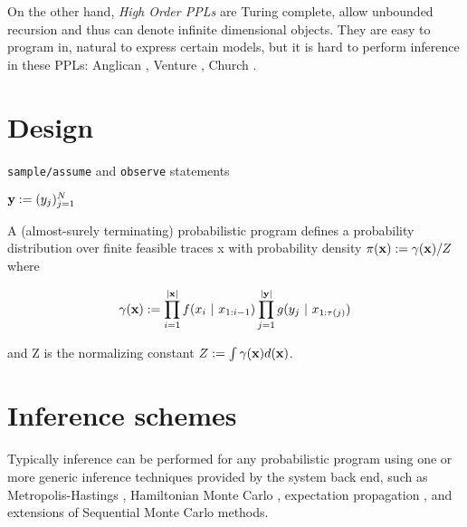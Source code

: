 On the other hand, \textit{High Order \gls{PPLs}} are Turing complete, allow unbounded recursion and thus can denote infinite dimensional objects.
They are easy to program in, natural to express certain models, but it is hard to perform inference in
these \gls{PPL}s: Anglican \cite{wood-aistats-2014}, Venture \cite{Mansinghka:2014ty}, Church \cite{Goodman:2012uq}.

\section{Design}


\texttt{sample/assume} and \texttt{observe} statements

$\boldsymbol{\mathbf{y}} := (y_j)_{j=1}^N$

A (almost-surely terminating) probabilistic program defines a probability distribution over finite feasible traces x with probability density $\pi(\boldsymbol{\mathbf{x}}) := \gamma(\boldsymbol{\mathbf{x}}) / Z$ where 

\begin{equation*}
\gamma(\boldsymbol{\mathbf{x}}) := \prod_{i=1}^{|\boldsymbol{\mathbf{x}}|}{f(x_i~|~x_{1:i-1})} \prod_{j=1}^{|\boldsymbol{\mathbf{y}}|}{g(y_j~|~x_{1:\tau(j)})}
\end{equation*}

and Z is the normalizing constant $Z := \int{\gamma(\ensuremath{\boldsymbol{\mathbf{x}}}) d(\ensuremath{\boldsymbol{\mathbf{x}}})}$.

\section{Inference schemes}
Typically inference can be performed for any probabilistic program using one or more generic inference techniques provided by the system back end, such as Metropolis-Hastings \cite{Wingate:2011ul, Mansinghka:2014ty}, Hamiltonian Monte Carlo \cite{Stan}, expectation propagation \cite{InferNET}, and extensions of Sequential Monte Carlo \cite{vandeMeent:2015uk, Paige:2014tc, Wood:2015tr} methods.



